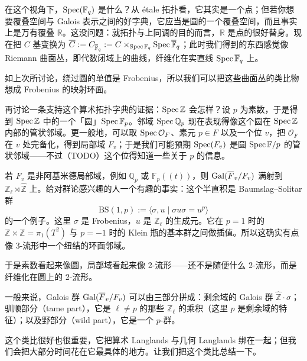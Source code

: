 在这个视角下，$\operatorname{Spec}(\mathbb{F}_q)$ 是什么？从 étale 拓扑看，它其实是一个点；但若你想要覆叠空间与 Galois 表示之间的好字典，它应当是圆的一个覆叠空间，而且事实上是万有覆叠 $\mathbb{R}$。这没问题：就拓扑与上同调的目的而言，$\mathbb{R}$ 是点的很好替身。现在把 $C$ 基变换为 $\overline{C}:=C_{\overline{\mathbb{F}}_q}:=C\times_{\operatorname{Spec}\mathbb{F}_q}\operatorname{Spec}\overline{\mathbb{F}}_q$；此时我们得到的东西感觉像 Riemann 曲面丛，即代数闭域上的曲线，纤维化在实直线 $\operatorname{Spec}\overline{\mathbb{F}}_q$ 上。

如上次所讨论，绕过圆的单值是 Frobenius，所以我们可以把这些曲面丛的类比物想成 Frobenius 的映射环面。

再讨论一条支持这个算术拓扑字典的证据：$\operatorname{Spec}\mathbb{Z}$ 会怎样？设 $p$ 为素数，于是得到 $\operatorname{Spec}\mathbb{Z}$ 中的一个「圆」$\operatorname{Spec}\mathbb{F}_p$。邻域 $\operatorname{Spec}\mathbb{Q}_p$ 现在表现得像这个圆在 $\operatorname{Spec}\mathbb{Z}$ 内部的管状邻域。更一般地，可以取 $\operatorname{Spec}\mathcal{O}_F$、素元 $p\in F$ 以及一个位 $v$，把 $\mathcal{O}_F$ 在 $v$ 处完备化，得到局部域 $F_v$；于是我们可能预期 $\operatorname{Spec}(F_v)$ 是圆 $\operatorname{Spec}\mathbb{F}/p$ 的管状邻域——不过（TODO）这个位得知道一些关于 $p$ 的信息。

若 $F_v$ 是非阿基米德局部域，例如 $\mathbb{Q}_p$ 或 $\mathbb{F}_p((t))$，则 $\operatorname{Gal}(\overline{F}_v/F_v)$ 满射到 $\mathbb{Z}_\ell\rtimes\widehat{\mathbb{Z}}$ 上。给对群论感兴趣的人一个有趣的事实：这个半直积是 Baumslag–Solitar 群
\[
\mathrm{BS}(1,p):=\langle \sigma,u\mid \sigma u\sigma=u^p\rangle
\]
的一个例子。这里 $\sigma$ 是 Frobenius，$u$ 是 $\mathbb{Z}_\ell$ 的生成元。它在 $p=1$ 时的 $\mathbb{Z}\times\mathbb{Z}=\pi_1(T^2)$ 与 $p=-1$ 时的 Klein 瓶的基本群之间做插值。所以这确实有点像 3-流形中一个纽结的环面邻域。


于是素数看起来像圆，局部域看起来像 2-流形——还不是随便什么 2-流形，而是纤维化在圆上的 2-流形。

一般来说，Galois 群 $\operatorname{Gal}(\overline{F}_v/F_v)$ 可以由三部分拼成：剩余域的 Galois 群 $\widehat{\mathbb{Z}}\cdot\sigma$；驯顺部分（tame part），它是 $\ell\ne p$ 的那些 $\mathbb{Z}_\ell$ 的乘积（这里 $p$ 是剩余域的特征）；以及野部分（wild part），它是一个 $p$-群。

这个类比很好也很重要，它把算术 Langlands 与几何 Langlands 绑在一起；但我们会把大部分时间花在它最具体的地方。让我们把这个类比总结一下。

